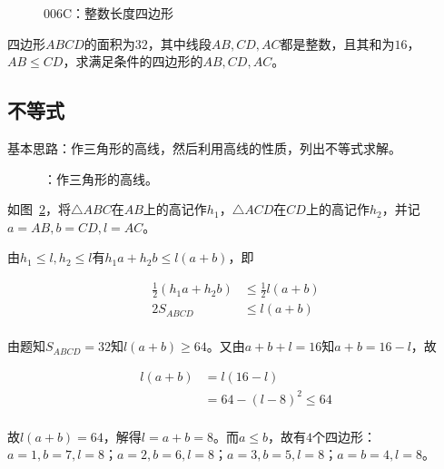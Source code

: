 

\begin{figure}
  \centering
  \caption{006C：整数长度四边形} \label{fig:006C}
\end{figure}

四边形$ABCD$的面积为$32$，其中线段$AB, CD, AC$都是整数，且其和为$16$，$AB \le CD$，求满足条件的四边形的$AB, CD, AC$。


\subsection{不等式} \label{subsec:006C-neqf}

基本思路：作三角形的高线，然后利用高线的性质，列出不等式求解。

\begin{figure}
  \centering
  \caption{：作三角形的高线。} \label{fig:006C-neqf}
\end{figure}

如图~\ref{fig:006C-neqf}，将$\triangle ABC$在$AB$上的高记作$h_1$，$\triangle ACD$在$CD$上的高记作$h_2$，并记$a = AB, b = CD, l = AC$。

由$h_1 \le l, h_2 \le l$有$h_1a + h_2b \le l(a + b)$，即

\begin{align*}
  \frac12(h_1a + h_2b) &\le\frac12l(a + b) \\
  2S_{ABCD} &\le l(a + b) \\
\end{align*}

由题知$S_{ABCD} = 32$知$l(a + b) \ge64$。又由$a + b + l = 16$知$a + b = 16 - l$，故

\begin{align*}
  l(a + b) &= l(16 - l) \\
  &= 64 - (l - 8)^2 \le64 \\
\end{align*}

故$l(a + b) = 64$，解得$l = a + b = 8$。而$a \le b$，故有$4$个四边形：$a = 1, b = 7, l = 8$；$a = 2, b = 6, l = 8$；$a = 3, b = 5, l = 8$；$a = b = 4, l = 8$。
